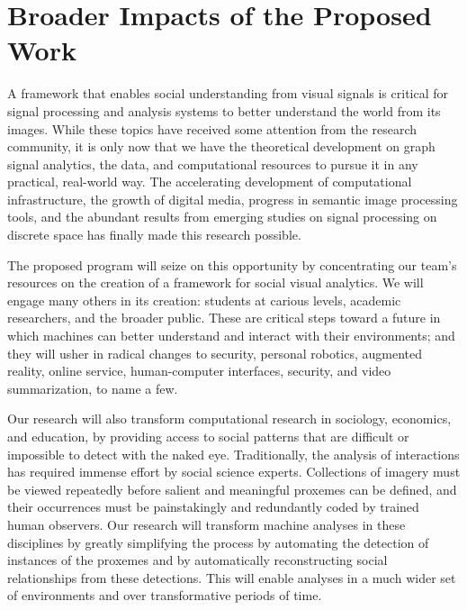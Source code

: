 \vspace{-8pt}
\section{Broader Impacts of the Proposed Work}
\label{sec:impacts}
\vspace{-8pt}
A framework that enables social understanding from visual signals is critical for signal processing and analysis systems to better understand the world from its images. While these topics have received some attention from the research community, it is only now that we have the theoretical development on graph signal analytics, the data, and computational resources to pursue it in any practical, real-world way. The accelerating development of computational infrastructure, the growth of digital media, progress in semantic image processing tools, and the abundant results from emerging studies on signal processing on discrete space has finally made this research possible.

The proposed program will seize on this opportunity by concentrating our team's resources on the creation of a framework for social visual analytics. We will engage many others in its creation: students at carious levels, academic researchers, and the broader public. These are critical steps toward a future in which machines can better understand and interact with their environments; and they will usher in radical changes to security, personal robotics, augmented reality, online service, human-computer interfaces, security, and video summarization, to name a few.

Our research will also transform computational research in sociology, economics, and education, by providing access to social patterns that are difficult or impossible to detect with the naked eye. Traditionally, the analysis of interactions has required immense effort by social science experts. Collections of imagery must be viewed repeatedly before salient and meaningful proxemes can be defined, and their occurrences must be painstakingly and redundantly coded by trained human observers. Our research will transform machine analyses in these disciplines by greatly simplifying the process by automating the detection of instances of the proxemes and by automatically reconstructing social relationships from these detections. This will enable analyses in a much wider set of environments and over transformative periods of time.

